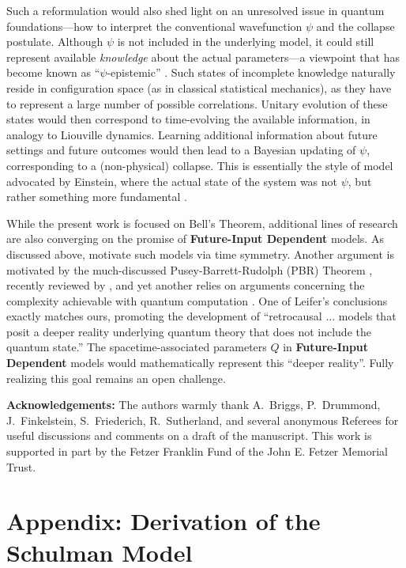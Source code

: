 \documentclass[rmp, aps, preprint, longbibliography]{revtex4-1}
\begin{document}
Such a reformulation would also shed light on an unresolved issue in quantum foundations---how to interpret the conventional wavefunction $\psi$ and the collapse postulate.  Although $\psi$ is not included in the underlying model, it could still represent available \emph{knowledge} about the actual parameters---a viewpoint that has become known as ``$\psi$-epistemic'' \cite{spekkens2007}.  Such states of incomplete knowledge naturally reside in configuration space (as in classical statistical mechanics), as they have to represent a large number of possible correlations.  Unitary evolution of these states would then correspond to time-evolving the available information, in analogy to Liouville dynamics.  Learning additional information about future settings and future outcomes would then lead to a Bayesian updating of $\psi$, corresponding to a (non-physical) collapse.   This is essentially the style of model advocated by Einstein, where the actual state of the system was not $\psi$, but rather something more fundamental \cite{harrigan2010}.  

While the present work is focused on Bell's Theorem, additional lines of research are also converging on the promise of {\bf Future-Input Dependent} models.  As discussed above, \textcite{leifer2017a} motivate such models via time symmetry.  Another argument is motivated by the much-discussed Pusey-Barrett-Rudolph (PBR) Theorem \cite{pusey2012}, recently reviewed by \textcite{leifer2014}, and yet another relies on arguments concerning the complexity achievable with quantum computation \cite{argaman2019}. One of Leifer's conclusions exactly matches ours, promoting the development of ``retrocausal $\dots$ models that posit a deeper reality underlying quantum theory that does not include the quantum state.''  The spacetime-associated parameters $Q$ in {\bf Future-Input Dependent} models would mathematically represent this ``deeper reality''.  Fully realizing this goal remains an open challenge.

{\bf Acknowledgements:} The authors warmly thank A.~Briggs, P.~Drummond, J.~Finkelstein, S.~Friederich, R.~Sutherland, and several anonymous Referees for useful discussions and comments on a draft of the manuscript. This work is supported in part by the Fetzer Franklin Fund of the John E. Fetzer Memorial Trust.

\section*{Appendix: Derivation of the Schulman Model}
\end{document}
